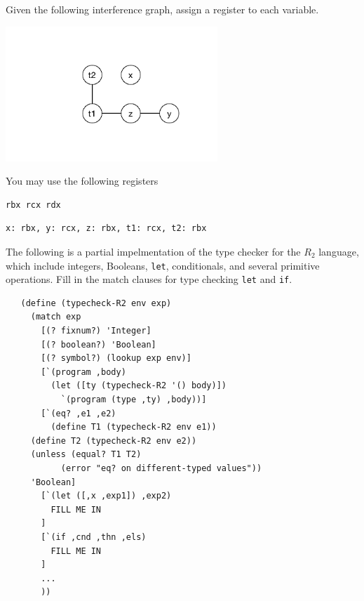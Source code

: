\documentclass[12pt,answers]{exam}
\begin{document}
\begin{questions}
\question[10] Given the following interference graph, assign a
register to each variable. 
\begin{center}
\includegraphics[height=2in]{interfere2}
\end{center}
You may use the following registers 
\begin{lstlisting}
rbx rcx rdx
\end{lstlisting}

\begin{solution}[1in]
\begin{lstlisting}
x: rbx, y: rcx, z: rbx, t1: rcx, t2: rbx
\end{lstlisting}
\end{solution}


\question[10] The following is a partial impelmentation of the type
checker for the $R_2$ language, which include integers, Booleans,
\texttt{let}, conditionals, and several primitive operations. Fill in
the match clauses for type checking \texttt{let} and \texttt{if}.

\begin{lstlisting}
   (define (typecheck-R2 env exp)
     (match exp
       [(? fixnum?) 'Integer]
       [(? boolean?) 'Boolean]
       [(? symbol?) (lookup exp env)]
       [`(program ,body)
         (let ([ty (typecheck-R2 '() body)])
           `(program (type ,ty) ,body))]
       [`(eq? ,e1 ,e2)
         (define T1 (typecheck-R2 env e1))
	 (define T2 (typecheck-R2 env e2))
	 (unless (equal? T1 T2)
           (error "eq? on different-typed values"))
	 'Boolean]
       [`(let ([,x ,exp1]) ,exp2)
         FILL ME IN
       ]
       [`(if ,cnd ,thn ,els)
         FILL ME IN
       ]
       ...
       ))
\end{lstlisting}


\end{questions}
\end{document}
